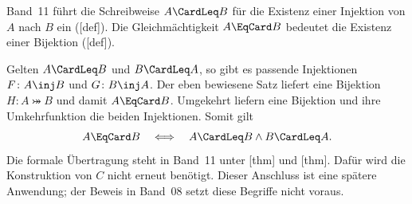 Band~11 führt die Schreibweise \(A\CardLeq B\) für die Existenz
einer Injektion von \(A\) nach \(B\) ein
([def]). Die Gleichmächtigkeit
\(A\EqCard B\) bedeutet die Existenz einer Bijektion
([def]).

Gelten \(A\CardLeq B\) und \(B\CardLeq A\), so gibt es passende
Injektionen \(F\colon A\inj B\) und \(G\colon B\inj A\).
Der eben bewiesene Satz liefert eine Bijektion \(H\colon A\bij B\)
und damit \(A\EqCard B\). Umgekehrt liefern eine Bijektion und ihre
Umkehrfunktion die beiden Injektionen. Somit gilt
\[
  A\EqCard B\quad\Longleftrightarrow\quad
  A\CardLeq B\land B\CardLeq A.
\]
Die formale Übertragung steht in Band~11 unter
[thm] und
[thm]. Dafür wird die
Konstruktion von \(C\) nicht erneut benötigt. Dieser Anschluss ist
eine spätere Anwendung; der Beweis in Band~08 setzt diese Begriffe nicht voraus.
